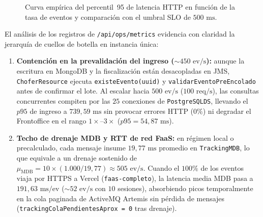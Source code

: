 \documentclass[11pt,a4paper,twocolumn]{article}
\begin{document}
\begin{figure}[t]
\centering
{}
\caption{Curva empírica del percentil~95 de latencia HTTP en función de la tasa de eventos y comparación con el umbral SLO de $500\text{ ms}$.}
\label{fig:latencia}
\end{figure}

El análisis de los registros de \texttt{/api/ops/metrics} evidencia con claridad la jerarquía de cuellos de botella en instancia única:
\begin{enumerate}
    \item \textbf{Contención en la prevalidación del ingreso ($\sim 450\text{ ev/s}$):} aunque la escritura en MongoDB y la fiscalización están desacopladas en JMS, \texttt{ChoferResource} ejecuta \texttt{existeEvento(uuid)} y \texttt{validarEventoPreEncolado} antes de confirmar el lote. Al escalar hacia $500\text{ ev/s}$ ($100\text{ req/s}$), las consultas concurrentes compiten por las $25$ conexiones de \texttt{PostgreSQLDS}, llevando el $p95$ de ingreso a $739{,}59\text{ ms}$ sin provocar errores HTTP ($0\%$) ni degradar el Frontoffice en el rango $1\times\text{--}3\times$ ($p95 = 54{,}87\text{ ms}$).
    \item \textbf{Techo de drenaje MDB y RTT de red FaaS:} en régimen local o precalculado, cada mensaje insume $19{,}77\text{ ms}$ promedio en \texttt{TrackingMDB}, lo que equivale a un drenaje sostenido de $\mu_{\text{MDB}} = 10 \times (1.000/19{,}77) \approx 505\text{ ev/s}$. Cuando el $100\%$ de los eventos viaja por HTTPS a Vercel (\texttt{faas-completo}), la latencia media MDB pasa a $191{,}63\text{ ms/ev}$ ($\sim 52\text{ ev/s}$ con $10$ sesiones), absorbiendo picos temporalmente en la cola paginada de ActiveMQ Artemis sin pérdida de mensajes (\texttt{trackingColaPendientesAprox = 0} tras drenaje).
\end{enumerate}
\end{document}
